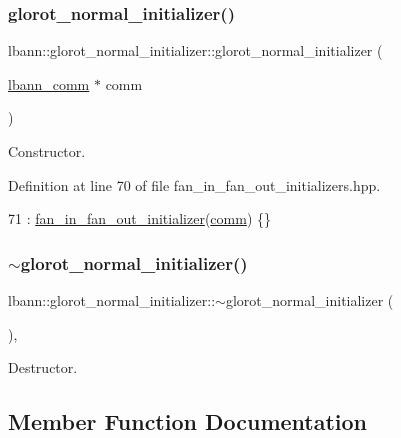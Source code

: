 \subsubsection{\texorpdfstring{glorot\+\_\+normal\+\_\+initializer()}{glorot\_normal\_initializer()}}
{\footnotesize\ttfamily lbann\+::glorot\+\_\+normal\+\_\+initializer\+::glorot\+\_\+normal\+\_\+initializer (\begin{DoxyParamCaption}\item[{\hyperlink{classlbann_1_1lbann__comm}{lbann\+\_\+comm} $\ast$}]{comm }\end{DoxyParamCaption})\hspace{0.3cm}{\ttfamily [inline]}}

Constructor. 

Definition at line 70 of file fan\+\_\+in\+\_\+fan\+\_\+out\+\_\+initializers.\+hpp.


\begin{DoxyCode}
71     : \hyperlink{classlbann_1_1fan__in__fan__out__initializer_a3a3811af11b1a70a57af846ae2cdf668}{fan\_in\_fan\_out\_initializer}(\hyperlink{file__io_8cpp_ab048c6f9fcbcfaa57ce68b00263dbebe}{comm}) \{\}
\end{DoxyCode}
\mbox{\label{classlbann_1_1glorot__normal__initializer_ac32dcf5794eae771955feaaf4557760b}} 
\subsubsection{\texorpdfstring{$\sim$glorot\+\_\+normal\+\_\+initializer()}{~glorot\_normal\_initializer()}}
{\footnotesize\ttfamily lbann\+::glorot\+\_\+normal\+\_\+initializer\+::$\sim$glorot\+\_\+normal\+\_\+initializer (\begin{DoxyParamCaption}{ }\end{DoxyParamCaption})\hspace{0.3cm}{\ttfamily [override]}, {\ttfamily [default]}}

Destructor. 

\subsection{Member Function Documentation}
\mbox{\label{classlbann_1_1glorot__normal__initializer_a8d05bb2c3d56a5dc3ca4be2a62640470}} 
